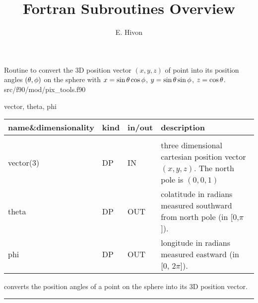 

\sloppy


\title{\healpix Fortran Subroutines Overview}
 \section[vec2ang]{ }
\label{sub:vec2ang}
\author{E. Hivon}

\begin{facility}
{Routine to convert the 3D position vector $(x,y,z)$ of point into its position
  angles  $(\theta,\phi)$ on the sphere with
$x = \sin\theta\cos\phi$, $y=\sin\theta\sin\phi$, $z=\cos\theta$.
}
{src/f90/mod/pix\_tools.f90}
\end{facility}

\begin{f90format}
{vector, theta, phi}
\end{f90format}


\begin{arguments}
{
\begin{tabular}{p{0.4\hsize} p{0.05\hsize} p{0.1\hsize} p{0.35\hsize}} \hline  
\textbf{name\&dimensionality} & \textbf{kind} & \textbf{in/out} & \textbf{description} \\ \hline
                   &   &   &                           \\ %
vector(3) & DP & IN & three dimensional cartesian position vector
                   $(x,y,z)$. The north pole is $(0,0,1)$\\
theta & DP & OUT & colatitude in radians measured southward from north pole (in
    [0,$\pi$]). \\
phi   & DP & OUT & longitude in radians measured eastward (in [0, $2\pi$]).\\
\end{tabular}
}
\end{arguments}

\begin{related}
  \begin{sulist}{} %
  \item[\htmlref{ang2vec}{sub:ang2vec}] converts the position angles of a point on the sphere 
into its 3D position vector.
  \end{sulist}
\end{related}

\rule{\hsize}{2mm}

